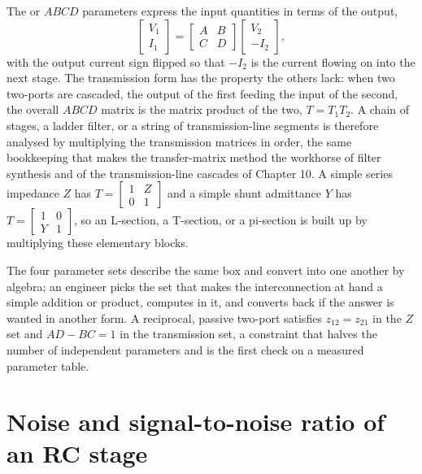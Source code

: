 The  or $ABCD$ parameters express the input
quantities in terms of the output,
\[
\begin{bmatrix} V_1 \\ I_1 \end{bmatrix}
=
\begin{bmatrix} A & B \\ C & D \end{bmatrix}
\begin{bmatrix} V_2 \\ -I_2 \end{bmatrix},
\]
with the output current sign flipped so that $-I_2$ is the current
flowing on into the next stage. The transmission form has the property
the others lack: when two two-ports are cascaded, the output of the first
feeding the input of the second, the overall $ABCD$ matrix is the matrix
product of the two, $T = T_1 T_2$. A chain of stages, a ladder filter, or
a string of transmission-line segments is therefore analysed by
multiplying the transmission matrices in order, the same bookkeeping that
makes the transfer-matrix method the workhorse of filter synthesis and of
the transmission-line cascades of Chapter 10. A simple series impedance
$Z$ has $T = \left[\begin{smallmatrix} 1 & Z \\ 0 & 1
\end{smallmatrix}\right]$ and a simple shunt admittance $Y$ has $T =
\left[\begin{smallmatrix} 1 & 0 \\ Y & 1 \end{smallmatrix}\right]$, so an
L-section, a T-section, or a pi-section is built up by multiplying these
elementary blocks.

The four parameter sets describe the same box and convert into one
another by algebra; an engineer picks the set that makes the
interconnection at hand a simple addition or product, computes in it, and
converts back if the answer is wanted in another form. A reciprocal,
passive two-port satisfies $z_{12} = z_{21}$ in the $Z$ set and
$AD - BC = 1$ in the transmission set, a constraint that halves the number
of independent parameters and is the first check on a measured parameter
table.

\section{Noise and signal-to-noise ratio of an RC stage}
\label{sec:vol04ch09:noise}


